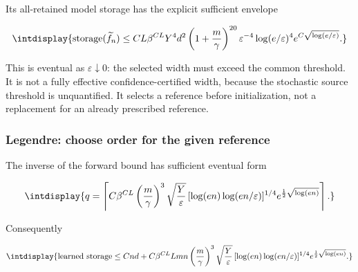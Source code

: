 
Its all-retained model storage has the explicit sufficient envelope


\begingroup\renewcommand{\theHequation}{intdisplay.18}
\begin{equation}
\intdisplay{
\operatorname{storage}(\widetilde f_n)\le
CL\beta^{CL}Y^4d^2\left(1+\frac m\gamma\right)^{20}
\varepsilon^{-4}\log(e/\varepsilon)^4
e^{C\sqrt{\log(e/\varepsilon)}}.
}
\label{int:eq-0015-dense-inverse-storage}
\end{equation}
\endgroup


This is eventual as \(\varepsilon\downarrow0\): the selected width must exceed the common threshold. It is not a fully effective confidence-certified width, because the stochastic source threshold is unquantified. It selects a reference before initialization, not a replacement for an already prescribed reference.


\subsubsection{Legendre: choose order for the given reference}



The inverse of the forward bound has sufficient eventual form


\begingroup\renewcommand{\theHequation}{intdisplay.19}
\begin{equation}
\intdisplay{
q=\left\lceil C\beta^{CL}\left(\frac m\gamma\right)^3
\sqrt{\frac Y\varepsilon}\,
[\log(en)\log(en/\varepsilon)]^{1/4}
e^{\frac12\sqrt{\log(en)}}\right\rceil.
}
\label{int:eq-0016-legendre-inverse}
\end{equation}
\endgroup


Consequently


\begingroup\renewcommand{\theHequation}{intdisplay.20}
\begin{equation}
\intdisplay{
\text{learned storage}\le Cnd+
C\beta^{CL}Lmn\left(\frac m\gamma\right)^3
\sqrt{\frac Y\varepsilon}\,
[\log(en)\log(en/\varepsilon)]^{1/4}
e^{\frac12\sqrt{\log(en)}}.
}
\label{int:eq-0017-legendre-inverse-storage}
\end{equation}
\endgroup


